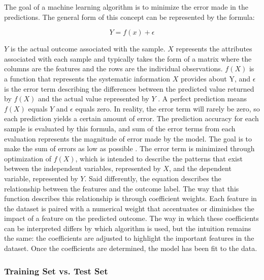 \documentclass[sigconf]{acmart}
\begin{document}
The goal of a machine learning algorithm is to minimize the error made in the predictions. The general form of this concept can be represented by the formula:

\[Y = f(x) + \epsilon\]

\(Y\) is the actual outcome associated with the sample. \(X\) represents the attributes associated with each sample and typically takes the form of a matrix where the columns are the features and the rows are the individual observations. \(f(X)\) is a function that represents the systematic information \(X\) provides about Y, and \(\epsilon\) is the error term describing the differences between the predicted value returned by \(f(X)\) and the actual value represented by \(Y\) \cite{cite03}. A perfect prediction means \(f(X)\) equals \(Y\) and \(\epsilon\) equals zero. In reality, the error term will rarely be zero, so each prediction yields a certain amount of error. The prediction accuracy for each sample is evaluated by this formula, and sum of the error terms from each evaluation represents the magnitude of error made by the model. The goal is to make the sum of errors as low as possible \cite{cite03}.
The error term is minimized through optimization of \(f(X)\), which is intended to describe the patterns that exist between the independent variables, represented by \(X\), and the dependent variable, represented by \(Y\). Said differently, the equation describes the relationship between the features and the outcome label. The way that this function describes this relationship is through coefficient weights. Each feature in the dataset is paired with a numerical weight that accentuates or diminishes the impact of a feature on the predicted outcome. The way in which these coefficients can be interpreted differs by which algorithm is used, but the intuition remains the same: the coefficients are adjusted to highlight the important features in the dataset. Once the coefficients are determined, the model has been fit to the data.

\subsubsection{Training Set vs. Test Set}
\end{document}
